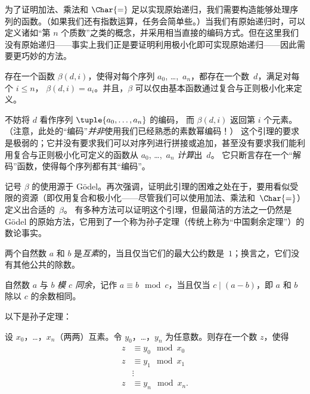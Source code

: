 \documentclass[../../../include/open-logic-section]{subfiles}
\begin{document}

为了证明加法、乘法和 $\Char{=}$ 足以实现原始递归，我们需要构造能够处理序列的函数。（如果我们还有指数运算，任务会简单些。）当我们有原始递归时，可以定义诸如“第 $n$ 个质数”之类的概念，并采用相当直接的编码方式。但在这里我们没有原始递归——事实上我们正是要证明利用极小化即可实现原始递归——因此需要更巧妙的方法。

\begin{lem}
存在一个函数 $\beta(d,i)$，使得对每个序列 $a_0$,
\dots,~$a_n$，都存在一个数~$d$，满足对每个 $i \le n$，
$\beta(d,i) = a_i$。并且，$\beta$ 可以仅由基本函数通过复合与正则极小化来定义。
\end{lem}

不妨将 $d$ 看作序列 $\tuple{a_0, \dots, a_n}$ 的编码，
而 $\beta(d,i)$ 返回第 $i$ 个元素。（注意，此处的“编码”\emph{并非}使用我们已经熟悉的素数幂编码！）
这个引理的要求是极弱的；它并没有要求我们可以对序列进行拼接或追加，甚至没有要求我们能利用复合与正则极小化可定义的函数从 $a_0$, \dots,~$a_n$ \emph{计算}出~$d$。
它只断言存在一个“解码”函数，使得每个序列都有其“编码”。

记号 $\beta$ 的使用源于 Gödel。再次强调，证明此引理的困难之处在于，要用看似受限的资源（即仅用复合和极小化——尽管我们可以使用加法、乘法和~$\Char{=}$）定义出合适的~$\beta$。
有多种方法可以证明这个引理，但最简洁的方法之一仍然是 Gödel 的原始方法，它用到了一个称为孙子定理（传统上称为“中国剩余定理”）的数论事实。

\begin{defn}
两个自然数 $a$ 和 $b$ 是\emph{互素}的，当且仅当它们的最大公约数是~$1$；换言之，它们没有其他公共的除数。
\end{defn}

\begin{defn}
自然数 $a$ 与 $b$ \emph{模 $c$ 同余}，记作 $a \equiv b \mod c$，当且仅当 $c \mid (a-b)$，即 $a$ 和 $b$ 除以 $c$ 的余数相同。
\end{defn}

以下是孙子定理：

\begin{thm}
设 $x_0$，\dots，$x_n$（两两）互素。令 $y_0$，\dots，$y_n$ 为任意数。则存在一个数 $z$，使得
\begin{align*}
z & \equiv y_0 \mod x_0 \\
z & \equiv y_1 \mod x_1 \\
& \vdots  \\
z & \equiv y_n \mod x_n.
\end{align*}
\end{thm}
\end{document}
